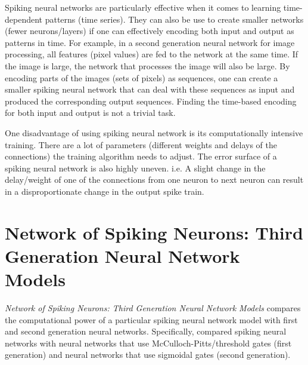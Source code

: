 \documentclass[12pt,A4]{article}
\begin{document}
Spiking neural networks are particularly effective when it comes to learning time-dependent patterns
(time series). They can also be use to create smaller networks (fewer neurons/layers) if one can 
effectively encoding both input and output as patterns in time. For example, in a second generation
neural network for image processing, all features (pixel values) are fed to the network at the same
time. If the image is large, the network that processes the image will also be large. By encoding parts of
the images (sets of pixels) as sequences, one can create a smaller spiking neural network that can
deal with these sequences as input and produced the corresponding output sequences. Finding the
time-based encoding for both input and output is not a trivial task.

One disadvantage of using spiking neural network is its computationally intensive training. There
are a lot of parameters (different weights and delays of the connections) the training algorithm 
needs to adjust. The error surface of a spiking neural network is also highly uneven. i.e. A slight
change in the delay/weight of one of the connections from one neuron to next neuron can result in a
disproportionate change in the output spike train.


\section*{Network of Spiking Neurons: Third Generation Neural Network Models}

\emph{Network of Spiking Neurons: Third Generation Neural Network Models} \cite{maass-1997-third}
compares the computational power of a particular spiking neural network model with first and second
generation neural networks. Specifically, \cite{maass-1997-third} compared spiking neural networks
with neural networks that use McCulloch-Pitts/threshold gates (first generation) and neural 
networks that use sigmoidal gates (second generation).
\end{document}
